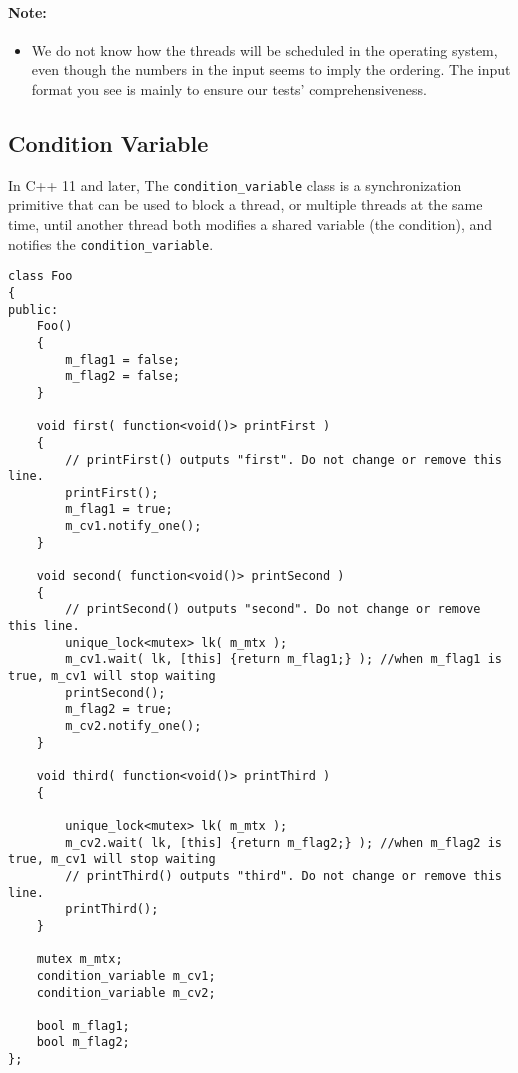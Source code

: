 \paragraph{Note:}

\begin{itemize}
\item We do not know how the threads will be scheduled in the operating system, even though the numbers in the input seems to imply the ordering. The input format you see is mainly to ensure our tests' comprehensiveness.
\end{itemize}

\subsection{Condition Variable}
In C++ 11 and later, The \texttt{condition\_variable} class is a synchronization primitive that can be used to block a thread, or multiple threads at the same time, until another thread both modifies a shared variable (the condition), and notifies the \texttt{condition\_variable}.

\setcounter{lstlisting}{0}
\begin{lstlisting}[style=customc, caption={Condition Variable}]
class Foo
{
public:
    Foo()
    {
        m_flag1 = false;
        m_flag2 = false;
    }

    void first( function<void()> printFirst )
    {
        // printFirst() outputs "first". Do not change or remove this line.
        printFirst();
        m_flag1 = true;
        m_cv1.notify_one();
    }

    void second( function<void()> printSecond )
    {
        // printSecond() outputs "second". Do not change or remove this line.
        unique_lock<mutex> lk( m_mtx );
        m_cv1.wait( lk, [this] {return m_flag1;} ); //when m_flag1 is true, m_cv1 will stop waiting
        printSecond();
        m_flag2 = true;
        m_cv2.notify_one();
    }

    void third( function<void()> printThird )
    {

        unique_lock<mutex> lk( m_mtx );
        m_cv2.wait( lk, [this] {return m_flag2;} ); //when m_flag2 is true, m_cv1 will stop waiting
        // printThird() outputs "third". Do not change or remove this line.
        printThird();
    }

    mutex m_mtx;
    condition_variable m_cv1;
    condition_variable m_cv2;

    bool m_flag1;
    bool m_flag2;
};
\end{lstlisting}